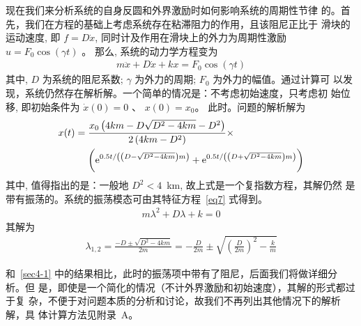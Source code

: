\documentclass[withoutpreface,bwprint]{cumcmthesis} %
\begin{document}
 现在我们来分析系统的自身反圆和外界激励时如何影响系统的周期性节律
的。首先，我们在方程的基础上考虑系统存在粘滞阻力的作用，且该阻尼正比于 滑块的运动速度, 即 $ f=D \dot{x} $, 同时计及作用在滑块上的外力为周期性激励 $ u=F_{0} \cos (\gamma t) $ 。 那么, 系统的动力学方程变为
\begin{align}
\label{eq5}
m \ddot{x}+D \dot{x}+k x=F_{0} \cos (\gamma t)
\end{align}
其中,  $D $ 为系统的阻尼系数; $ \gamma $ 为外力的周期; $ F_{0} $ 为外力的幅值。通过计算可 以发现，系统仍然存在解析解。一个简单的情况是：不考虑初始速度，只考虑初 始位移, 即初始条件为 $ \dot{x}(0)=0 $ 、  $x(0)=x_{0}  $。 此时。问题的解析解为
\begin{align}
\label{eq6}
x(t)&=\frac{x_{0}\left(4 k m-D \sqrt{D^{2}-4 k m}-D^{2}\right)}{2\left(4 k m-D^{2}\right)}\times\notag\\
&\quad~\bigg({\rm e}^{0.5 t /\left(\left(D-\sqrt{D^{2}-4 k m}\right) m\right)}+{\rm e}^{0.5 t /\left(\left(D+\sqrt{D^{2}-4 k m}\right) m\right)}\bigg)
\end{align}
其中, 值得指出的是：一般地  $D^{2}<4$~km, 故上式是一个复指数方程，其解仍然 是带有振荡的。系统的振荡模态可由其特征方程~\eqref{eq7} 式得到。
\begin{align}
\label{eq7}
m \lambda^{2}+D \lambda+k=0
\end{align}
其解为
\begin{align}
\label{eq8}
\lambda_{1,2}=\frac{-D \pm \sqrt{D^{2}-4 k m}}{2 m}=-\frac{D}{2 m} \pm \sqrt{\left(\frac{D}{2 m}\right)^{2}-\frac{k}{m}}
\end{align}

和~\ref{sec4-1} 中的结果相比，此时的振荡项中带有了阻尼，后面我们将做详细分析。但
是，即使是一个简化的情况（不计外界激励和初始速度），其解的形式都过于复
杂，不便于对问题本质的分析和讨论，故我们不再列出其他情况下的解析解，具
体计算方法见附录~A。
\end{document}
